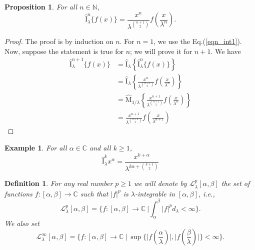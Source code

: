 \documentclass[12pt]{article}
\newcommand{\C}{\mathbb{C}}
\newcommand{\N}{\mathbb{N}}
\newcommand{\M}{\widehat{\mathrm{M}}}
\newcommand{\I}{\widehat{\mathrm{I}}}
\newtheorem{definition}{Definition}
\newtheorem{proposition}{Proposition}
\newtheorem{example}{Example}
\begin{document}
\begin{proposition}\label{prop_nth-int}
For all $n\in\N$,
    \begin{equation}
        \I_{\lambda}^{n}\{f(x)\}=\frac{x^n}{\lambda^{\binom{n+1}{2}}}f\left(\frac{x}{\lambda^n}\right).
    \end{equation}
\end{proposition}
\begin{proof}
The proof is by induction on $n$. For $n=1$, we use the Eq.(\ref{eqn_int1}). Now, suppose the statement is true for $n$; we will prove it for $n+1$. We have 
\begin{align*}
    \I_{\lambda}^{n+1}\{f(x)\}&=\I_{\lambda}\left\{\I_{\lambda}^{n}\{f(x)\}\right\}\\
    &=\I_{\lambda}\left\{\frac{x^{n}}{\lambda^{\binom{n+1}{2}}}f\left(\frac{x}{\lambda^n}\right)\right\}\\
    &=\M_{1/\lambda}\left\{\frac{x^{n+1}}{\lambda^{\binom{n+1}{2}}}f\left(\frac{x}{\lambda^n}\right)\right\}\\
    &=\frac{x^{n+1}}{\lambda^{\binom{n+2}{2}}}f\left(\frac{x}{\lambda^{n+1}}\right)
\end{align*}
\end{proof}

\begin{example}
For all $\alpha\in\C$ and all $k\geq1$,
    \begin{equation}
        \I_{\lambda}^{k}x^{\alpha}=\frac{x^{k+\alpha}}{\lambda^{k\alpha+\binom{k+1}{2}}}
    \end{equation}
\end{example}


\begin{definition}
For any real number $p\geq1$ we will denote by $\mathcal{L}_{\lambda}^{p}[\alpha,\beta]$ the set of functions $f:[\alpha,\beta]\rightarrow\C$ such that $\vert f\vert^p$ is $\lambda$-integrable in $[\alpha,\beta]$, i.e.,
\begin{equation}
    \mathcal{L}_{\lambda}^{p}[\alpha,\beta]=\bigg\{f:[\alpha,\beta]\rightarrow\C\ \Big\vert\int_{\alpha}^{\beta}\vert f\vert^pd_{\lambda}<\infty\bigg\}.
\end{equation}
We also set
\begin{equation}
    \mathcal{L}_{\lambda}^{\infty}[\alpha,\beta]=\bigg\{f:[\alpha,\beta]\rightarrow\C\ \Big\vert\ \sup\Big\{\Big\vert f\left(\frac{\alpha}{\lambda}\right)\Big\vert,\Big\vert f\left(\frac{\beta}{\lambda}\right)\Big\vert\Big\}<\infty\bigg\}.
\end{equation}
\end{definition}
\end{document}
